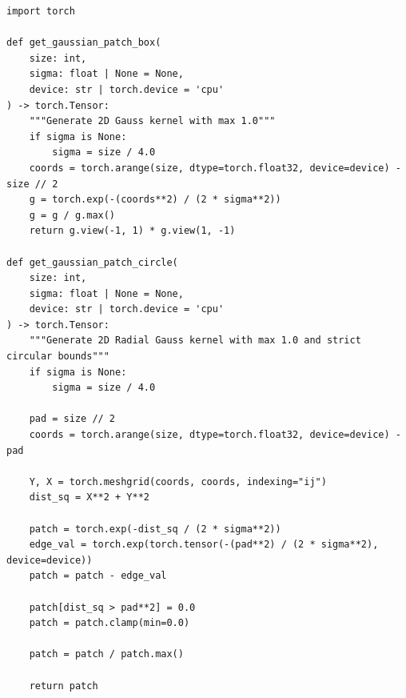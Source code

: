 \begin{lstlisting}[caption={Функція генерації маски інтерактивності}]
import torch

def get_gaussian_patch_box(
    size: int,
    sigma: float | None = None,
    device: str | torch.device = 'cpu'
) -> torch.Tensor:
    """Generate 2D Gauss kernel with max 1.0"""
    if sigma is None:
        sigma = size / 4.0
    coords = torch.arange(size, dtype=torch.float32, device=device) - size // 2
    g = torch.exp(-(coords**2) / (2 * sigma**2))
    g = g / g.max()
    return g.view(-1, 1) * g.view(1, -1)

def get_gaussian_patch_circle(
    size: int,
    sigma: float | None = None,
    device: str | torch.device = 'cpu'
) -> torch.Tensor:
    """Generate 2D Radial Gauss kernel with max 1.0 and strict circular bounds"""
    if sigma is None:
        sigma = size / 4.0

    pad = size // 2
    coords = torch.arange(size, dtype=torch.float32, device=device) - pad

    Y, X = torch.meshgrid(coords, coords, indexing="ij")
    dist_sq = X**2 + Y**2

    patch = torch.exp(-dist_sq / (2 * sigma**2))
    edge_val = torch.exp(torch.tensor(-(pad**2) / (2 * sigma**2), device=device))
    patch = patch - edge_val

    patch[dist_sq > pad**2] = 0.0
    patch = patch.clamp(min=0.0)

    patch = patch / patch.max()
    
    return patch
\end{lstlisting}

